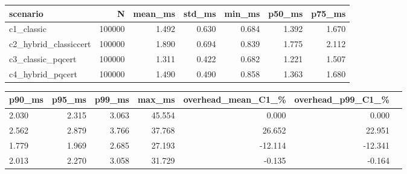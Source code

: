 \begin{tabular}{lrrrrrr}
	\toprule
	scenario & N & mean\_ms & std\_ms & min\_ms & p50\_ms & p75\_ms \\
	\midrule
	c1\_classic & 100000 & 1.492 & 0.630 & 0.684 & 1.392 & 1.670 \\
	c2\_hybrid\_classiccert & 100000 & 1.890 & 0.694 & 0.839 & 1.775 & 2.112 \\
	c3\_classic\_pqcert & 100000 & 1.311 & 0.422 & 0.682 & 1.221 & 1.507 \\
	c4\_hybrid\_pqcert & 100000 & 1.490 & 0.490 & 0.858 & 1.363 & 1.680 \\
	\bottomrule
\end{tabular}

\vspace{1em}

\begin{tabular}{lrrrrrr}
	\toprule
	p90\_ms & p95\_ms & p99\_ms & max\_ms & overhead\_mean\_C1\_\% & overhead\_p99\_C1\_\% \\
	\midrule
	2.030 & 2.315 & 3.063 & 45.554 & 0.000 & 0.000 \\
	2.562 & 2.879 & 3.766 & 37.768 & 26.652 & 22.951 \\
	1.779 & 1.969 & 2.685 & 27.193 & -12.114 & -12.341 \\
	2.013 & 2.270 & 3.058 & 31.729 & -0.135 & -0.164 \\
	\bottomrule
\end{tabular}